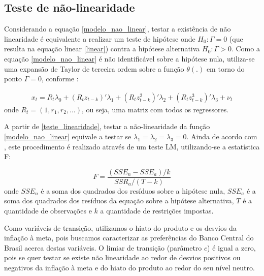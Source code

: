 \documentclass[
	article,			%
	11pt,				%
	oneside,			%
	a4paper,			%
	english,			%
	brazil,				%
	]{abntex2}
\begin{document}
		
		
		
		
\subsection{Teste de não-linearidade}
	
	Considerando a equação \ref{modelo_nao_linear}, testar a existência de não linearidade é equivalente a realizar um teste de hipótese onde $H_0: \Gamma = 0$ (que resulta na equação linear \ref{linear})  contra a hipótese alternativa $H_0: \Gamma > 0$. Como a equação \ref{modelo_nao_linear} é não identificável sobre a hipótese nula, utiliza-se uma expansão de Taylor de terceira ordem sobre a função $\theta(.)$ em torno do ponto $\Gamma = 0$, conforme :
	
	\begin{eqnarray} \label{teste_linearidade}
		x_t =  R_t \lambda_0 + (R_t z_{t-k})' \lambda_1 + (R_t z_{t-k}^2)' \lambda_2 + (R_t z_{t-k}^3)' \lambda_3 + \nu_t
	\end{eqnarray}
	onde $R_t = (1, r_1, r_2, ...)$, ou seja, uma matriz com todos os regressores.
	
	A partir de \ref{teste_linearidade}, testar a não-linearidade da função \ref{modelo_nao_linear} equivale a testar se $\lambda_1 = \lambda_2 = \lambda_3 = 0$. Ainda de acordo com , este procedimento é realizado através de um teste LM, utilizando-se a estatística F:
	
	\begin{equation} \label{estatistica_f}
		F = \frac{(SSE_n - SSE_a) / k}{SSR_a / (T - k)}
	\end{equation}
	onde $SSE_n$ é a soma dos quadrados dos resíduos sobre a hipótese nula, $SSE_a$ é a soma dos quadrados dos resíduos da equação sobre a hipótese alternativa, $T$ é a quantidade de observações e $k$ a quantidade de restrições impostas.
	
	Como variáveis de transição, utilizamos o hiato do produto e os desvios da inflação à meta, pois buscamos caracterizar as preferências do Banco Central do Brasil acerca destas variáveis. O limiar de transição (parâmetro $c$) é igual a zero, pois se quer testar se existe não linearidade ao redor de desvios positivos ou negativos da inflação à meta e do hiato do produto ao redor do seu nível neutro.
	
\end{document}
